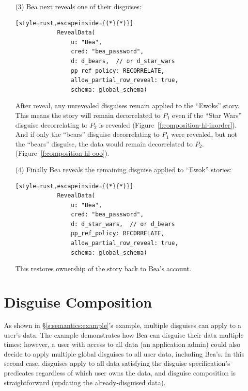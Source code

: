 \begin{enumerate}[nosep]
    \item[(3)] Bea next reveals one of their disguises:
        \vspace{12pt}
        \begin{lstlisting}[style=rust,escapeinside={(*}{*)}]
            RevealData(
                u: "Bea", 
                cred: "bea_password",
                d: d_bears,  // or d_star_wars
                pp_ref_policy: RECORRELATE,
                allow_partial_row_reveal: true,
                schema: global_schema)
        \end{lstlisting}

        After reveal, any unrevealed disguises remain applied to the ``Ewoks''
        story.
        This means the story will remain decorrelated to $P_1$ even if the ``Star
        Wars'' disguise decorrelating to $P_2$ is revealed
        (Figure~\ref{f:composition-hl-inorder}).
        And if only the ``bears'' disguise decorrelating to $P_1$ were
        revealed, but not the ``bears'' disguise, the data would remain
        decorrelated to $P_2$.  (Figure~\ref{f:composition-hl-ooo}).

    \item[(4)] Finally Bea reveals the remaining disguise applied to ``Ewok''
        stories:

        \vspace{12pt}
        \begin{lstlisting}[style=rust,escapeinside={(*}{*)}]
            RevealData(
                u: "Bea", 
                cred: "bea_password",
                d: d_star_wars,  // or d_bears
                pp_ref_policy: RECORRELATE,
                allow_partial_row_reveal: true,
                schema: global_schema)
        \end{lstlisting}
        
        This restores ownership of the story back to Bea's account.

\end{enumerate}


\section{Disguise Composition}
\label{s:semantics:hl:composition}

As shown in \S\ref{s:semantics:example}'s example, multiple disguises can apply
to a user's data. The example demonstrates how Bea can disguise their data
multiple times; however, a user with access to all data (\eg an application
admin) could also decide to apply multiple global disguises to all user data,
including Bea's.  In this second case, disguises apply to all data satisfying
the disguise specification's predicates regardless of which user owns the data,
and disguise composition is straightforward (updating the already-disguised
data).

